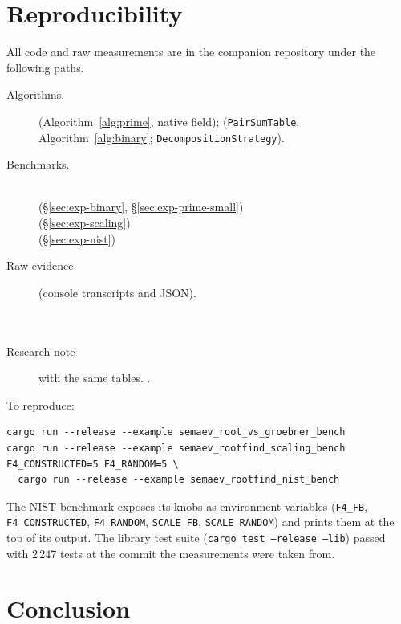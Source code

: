 \documentclass[10pt,a4paper]{article}
\theoremstyle{remark}
\newcommand{\code}[1]{\texttt{#1}}
\begin{document}
\section{Reproducibility}
\label{sec:repro}

All code and raw measurements are in the companion repository under the
following paths.

\begin{description}
\item[Algorithms.]
  (Algorithm~\ref{alg:prime}, native field);
  (\code{PairSumTable}, Algorithm~\ref{alg:binary};
  \code{DecompositionStrategy}).
\item[Benchmarks.] \hfill\\
  (\S\ref{sec:exp-binary}, \S\ref{sec:exp-prime-small}) \\
  (\S\ref{sec:exp-scaling}) \\
  (\S\ref{sec:exp-nist})
\item[Raw evidence] (console transcripts and JSON). \hfill\\
   \\
   \\
\item[Research note] with the same tables.
  .
\end{description}

\noindent To reproduce:
\begin{verbatim}
cargo run --release --example semaev_root_vs_groebner_bench
cargo run --release --example semaev_rootfind_scaling_bench
F4_CONSTRUCTED=5 F4_RANDOM=5 \
  cargo run --release --example semaev_rootfind_nist_bench
\end{verbatim}
The NIST benchmark exposes its knobs as environment variables
(\code{F4\_FB}, \code{F4\_CONSTRUCTED}, \code{F4\_RANDOM},
\code{SCALE\_FB}, \code{SCALE\_RANDOM}) and prints them at the top of
its output. The library test suite (\code{cargo test --release --lib})
passed with 2\,247 tests at the commit the measurements were taken from.

\section{Conclusion}
\end{document}
